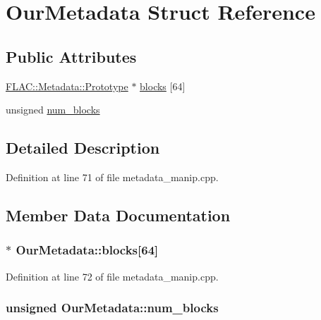 \hypertarget{struct_our_metadata}{}\section{Our\+Metadata Struct Reference}
\label{struct_our_metadata}
\subsection*{Public Attributes}
\begin{DoxyCompactItemize}
\item 
\hyperlink{class_f_l_a_c_1_1_metadata_1_1_prototype}{F\+L\+A\+C\+::\+Metadata\+::\+Prototype} $\ast$ \hyperlink{struct_our_metadata_a32636cd2336f43ce0bde0a97ae1ab42a}{blocks} \mbox{[}64\mbox{]}
\item 
unsigned \hyperlink{struct_our_metadata_a0629cb05c971c929f0527fd89e37c5bc}{num\+\_\+blocks}
\end{DoxyCompactItemize}


\subsection{Detailed Description}


Definition at line 71 of file metadata\+\_\+manip.\+cpp.



\subsection{Member Data Documentation}
\subsubsection[{\texorpdfstring{blocks}{blocks}}]{$\ast$ Our\+Metadata\+::blocks\mbox{[}64\mbox{]}}\hypertarget{struct_our_metadata_a32636cd2336f43ce0bde0a97ae1ab42a}{}\label{struct_our_metadata_a32636cd2336f43ce0bde0a97ae1ab42a}


Definition at line 72 of file metadata\+\_\+manip.\+cpp.

\subsubsection[{\texorpdfstring{num\+\_\+blocks}{num_blocks}}]{\setlength{\rightskip}{0pt plus 5cm}unsigned Our\+Metadata\+::num\+\_\+blocks}\hypertarget{struct_our_metadata_a0629cb05c971c929f0527fd89e37c5bc}{}\label{struct_our_metadata_a0629cb05c971c929f0527fd89e37c5bc}


